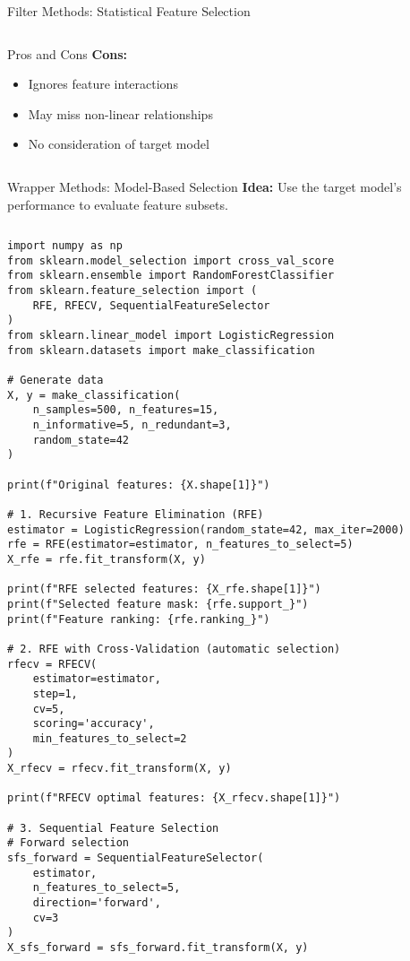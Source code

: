\documentclass[aspectratio=169,11pt]{beamer}
\begin{document}
\begin{frame}[fragile]{Filter Methods: Statistical Feature Selection}
\begin{columns}
\begin{column}{0.45\textwidth}
\begin{block}{Pros and Cons}
\textbf{Cons:}
\begin{itemize}
\item Ignores feature interactions
\item May miss non-linear relationships
\item No consideration of target model
\end{itemize}
\end{block}
\end{column}
\end{columns}
\end{frame}

\begin{frame}[fragile]{Wrapper Methods: Model-Based Selection}
\textbf{Idea:} Use the target model's performance to evaluate feature subsets.

\begin{columns}
\begin{column}{0.55\textwidth}
\begin{lstlisting}
import numpy as np
from sklearn.model_selection import cross_val_score
from sklearn.ensemble import RandomForestClassifier
from sklearn.feature_selection import (
    RFE, RFECV, SequentialFeatureSelector
)
from sklearn.linear_model import LogisticRegression
from sklearn.datasets import make_classification

# Generate data
X, y = make_classification(
    n_samples=500, n_features=15, 
    n_informative=5, n_redundant=3,
    random_state=42
)

print(f"Original features: {X.shape[1]}")

# 1. Recursive Feature Elimination (RFE)
estimator = LogisticRegression(random_state=42, max_iter=2000)
rfe = RFE(estimator=estimator, n_features_to_select=5)
X_rfe = rfe.fit_transform(X, y)

print(f"RFE selected features: {X_rfe.shape[1]}")
print(f"Selected feature mask: {rfe.support_}")
print(f"Feature ranking: {rfe.ranking_}")

# 2. RFE with Cross-Validation (automatic selection)
rfecv = RFECV(
    estimator=estimator, 
    step=1, 
    cv=5, 
    scoring='accuracy',
    min_features_to_select=2
)
X_rfecv = rfecv.fit_transform(X, y)

print(f"RFECV optimal features: {X_rfecv.shape[1]}")

# 3. Sequential Feature Selection
# Forward selection
sfs_forward = SequentialFeatureSelector(
    estimator, 
    n_features_to_select=5,
    direction='forward',
    cv=3
)
X_sfs_forward = sfs_forward.fit_transform(X, y)


\end{lstlisting}
\end{column}
\end{columns}
\end{frame}
\end{document}
